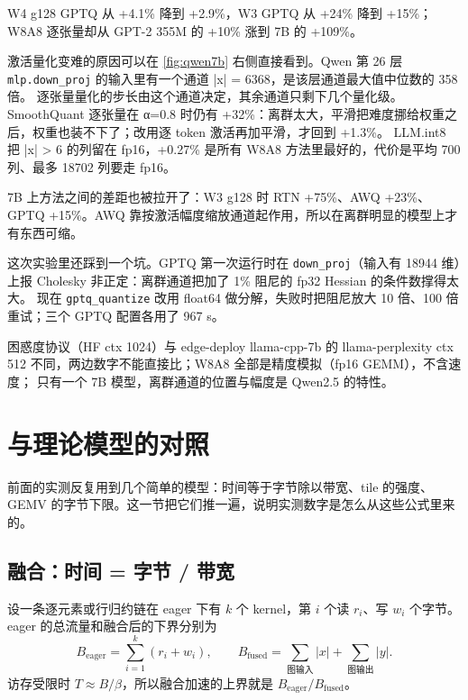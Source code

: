 \documentclass[11pt,a4paper]{ctexart}
\begin{document}
\begin{findingbox}
W4 g128 GPTQ 从 +4.1\% 降到 +2.9\%，W3 GPTQ 从 +24\% 降到 +15\%；W8A8 逐张量却从 GPT-2 355M 的 +10\% 涨到 7B 的 +109\%。
\end{findingbox}

激活量化变难的原因可以在 \cref{fig:qwen7b} 右侧直接看到。Qwen 第 26 层 \texttt{mlp.down\_proj} 的输入里有一个通道 |x| = 6368，是该层通道最大值中位数的 358 倍。
逐张量量化的步长由这个通道决定，其余通道只剩下几个量化级。
SmoothQuant 逐张量在 α=0.8 时仍有 +32\%：离群太大，平滑把难度挪给权重之后，权重也装不下了；改用逐 token 激活再加平滑，才回到 +1.3\%。
LLM.int8 把 |x| > 6 的列留在 fp16，+0.27\% 是所有 W8A8 方法里最好的，代价是平均 700 列、最多 18702 列要走 fp16。

7B 上方法之间的差距也被拉开了：W3 g128 时 RTN +75\%、AWQ +23\%、GPTQ +15\%。AWQ 靠按激活幅度缩放通道起作用，所以在离群明显的模型上才有东西可缩。

这次实验里还踩到一个坑。GPTQ 第一次运行时在 \texttt{down\_proj}（输入有 18944 维）上报 Cholesky 非正定：离群通道把加了 1\% 阻尼的 fp32 Hessian 的条件数撑得太大。
现在 \texttt{gptq\_quantize} 改用 float64 做分解，失败时把阻尼放大 10 倍、100 倍重试；三个 GPTQ 配置各用了 967 s。

\begin{caveatbox}
困惑度协议（HF ctx 1024）与 edge-deploy llama-cpp-7b 的 llama-perplexity ctx 512 不同，两边数字不能直接比；W8A8 全部是精度模拟（fp16 GEMM），不含速度；
只有一个 7B 模型，离群通道的位置与幅度是 Qwen2.5 的特性。
\end{caveatbox}

\section{与理论模型的对照}

前面的实测反复用到几个简单的模型：时间等于字节除以带宽、tile 的强度、GEMV 的字节下限。这一节把它们推一遍，说明实测数字是怎么从这些公式里来的。

\subsection{融合：时间 = 字节 / 带宽}

设一条逐元素或行归约链在 eager 下有 $k$ 个 kernel，第 $i$ 个读 $r_i$、写 $w_i$ 个字节。eager 的总流量和融合后的下界分别为
\begin{equation}
B_{\text{eager}}=\sum_{i=1}^{k}(r_i+w_i),\qquad B_{\text{fused}}=\sum_{\text{图输入}}|x|+\sum_{\text{图输出}}|y| .
\label{eq:fusion-bytes}
\end{equation}
访存受限时 $T\approx B/\beta$，所以融合加速的上界就是 $B_{\text{eager}}/B_{\text{fused}}$。
\end{document}

